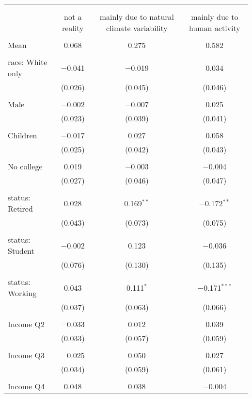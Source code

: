 
\begin{tabular}{@{\extracolsep{5pt}}lccc} 
\\[-1.8ex]\hline 
\hline \\[-1.8ex] 
\\[-1.8ex] & not a reality & mainly due to natural climate variability & mainly due to human activity \\ 
\hline \\[-1.8ex] 
 Mean & 0.068 & 0.275 & 0.582  \\ \hline \\[-1.8ex] race: White only & $-$0.041 & $-$0.019 & 0.034 \\ 
  & (0.026) & (0.045) & (0.046) \\ 
  & & & \\ 
 Male & $-$0.002 & $-$0.007 & 0.025 \\ 
  & (0.023) & (0.039) & (0.041) \\ 
  & & & \\ 
 Children & $-$0.017 & 0.027 & 0.058 \\ 
  & (0.025) & (0.042) & (0.043) \\ 
  & & & \\ 
 No college & 0.019 & $-$0.003 & $-$0.004 \\ 
  & (0.027) & (0.046) & (0.047) \\ 
  & & & \\ 
 status: Retired & 0.028 & 0.169$^{**}$ & $-$0.172$^{**}$ \\ 
  & (0.043) & (0.073) & (0.075) \\ 
  & & & \\ 
 status: Student & $-$0.002 & 0.123 & $-$0.036 \\ 
  & (0.076) & (0.130) & (0.135) \\ 
  & & & \\ 
 status: Working & 0.043 & 0.111$^{*}$ & $-$0.171$^{***}$ \\ 
  & (0.037) & (0.063) & (0.066) \\ 
  & & & \\ 
 Income Q2 & $-$0.033 & 0.012 & 0.039 \\ 
  & (0.033) & (0.057) & (0.059) \\ 
  & & & \\ 
 Income Q3 & $-$0.025 & 0.050 & 0.027 \\ 
  & (0.034) & (0.059) & (0.061) \\ 
  & & & \\ 
 Income Q4 & 0.048 & 0.038 & $-$0.004 \\ 

\end{tabular}
